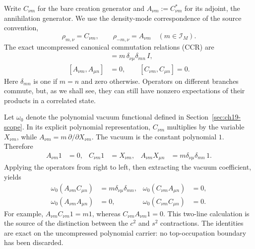Write $C_{\nu m}$ for the bare creation generator and
$A_{\nu m}:=C_{\nu m}^{*}$ for its adjoint, the annihilation generator.
We use the density-mode correspondence of the source convention,
\[
  \rho_{m,\nu}=C_{\nu m},\qquad
  \rho_{-m,\nu}=A_{\nu m}\quad(m\in\mathcal I_M).
\]
The exact uncompressed canonical commutation relations (CCR) are
\begin{align}
 [A_{\nu m},C_{\mu n}]&=m\,\delta_{\nu\mu}\delta_{mn}\,I,
   \label{eq:ch19-modes-ccr}\\
 [A_{\nu m},A_{\mu n}]&=0,\qquad
 [C_{\nu m},C_{\mu n}]=0.
\end{align}
Here $\delta_{mn}$ is one if $m=n$ and zero otherwise. Operators on
different branches commute, but, as we shall see, they can still have
nonzero expectations of their products in a correlated state.

Let $\omega_0$ denote the polynomial vacuum functional defined in
Section~\ref{sec:ch19-scope}. In its explicit polynomial representation,
$C_{\nu m}$ multiplies by the variable $X_{\nu m}$, while
$A_{\nu m}=m\,\partial/\partial X_{\nu m}$. The vacuum is the
constant polynomial $1$. Therefore
\begin{align}
 A_{\nu m}1&=0,
 &C_{\nu m}1&=X_{\nu m},
 &A_{\nu m}X_{\mu n}
   &=m\delta_{\nu\mu}\delta_{mn}\,1.
\end{align}
Applying the operators from right to left, then extracting the vacuum
coefficient, yields
\begin{align}
 \omega_0(A_{\nu m}C_{\mu n})
   &=m\delta_{\nu\mu}\delta_{mn},
   &\omega_0(C_{\nu m}A_{\mu n})&=0,
     \label{eq:ch19-free-two-orders}\\
 \omega_0(A_{\nu m}A_{\mu n})&=0,
   &\omega_0(C_{\nu m}C_{\mu n})&=0.
     \label{eq:ch19-free-like-pairs}
\end{align}
For example, $A_{\nu m}C_{\nu m}1=m1$, whereas
$C_{\nu m}A_{\nu m}1=0$. This two-line calculation is the source of
the distinction between the $c^2$ and $s^2$ contractions. The identities
are exact on the uncompressed polynomial carrier: no top-occupation
boundary has been discarded.

